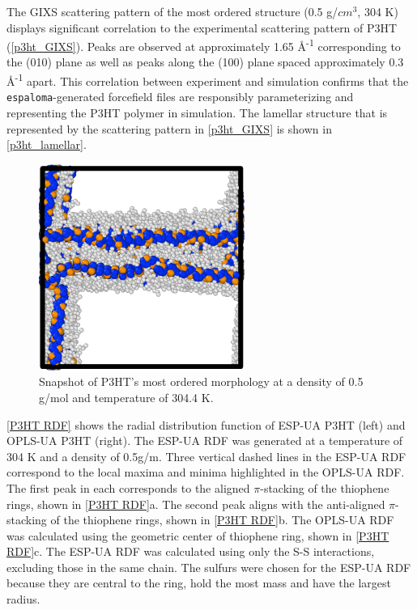 \par The GIXS scattering pattern of the most ordered structure (0.5 g/$cm^3$, 304 K) displays significant correlation to the experimental scattering pattern of P3HT (\autoref{p3ht_GIXS}). Peaks are observed at approximately 1.65 \AA \textsuperscript{-1} corresponding to the (010) plane as well as peaks along the (100) plane spaced approximately 0.3 \AA \textsuperscript{-1} apart. This correlation between experiment and simulation confirms that the \texttt{espaloma}-generated forcefield files are responsibly parameterizing and representing the P3HT polymer in simulation. The lamellar structure that is represented by the scattering pattern in \autoref{p3ht_GIXS} is shown in \autoref{p3ht_lamellar}. 
\begin{figure}[hbt!]
    \centering
    \includegraphics[width=0.6\textwidth]{src/figures/FF_figs/p3ht_0.5den_2.42kT.png}
    \caption{Snapshot of P3HT's most ordered morphology at a density of 0.5 g/mol and temperature of 304.4 K.}
    \label{p3ht_lamellar}
\end{figure}
\par \autoref{P3HT RDF} shows the radial distribution function of ESP-UA P3HT (left) and OPLS-UA P3HT (right). The ESP-UA RDF was generated at a temperature of 304 K and a density of 0.5g/m. Three vertical dashed lines in the ESP-UA RDF correspond to the local maxima and minima highlighted in the OPLS-UA RDF. The first peak in each corresponds to the aligned $\pi$-stacking of the thiophene rings, shown in \autoref{P3HT RDF}a. The second peak aligns with the anti-aligned $\pi$-stacking of the thiophene rings, shown in \autoref{P3HT RDF}b. The OPLS-UA RDF was calculated using the geometric center of thiophene ring, shown in \autoref{P3HT RDF}c. The ESP-UA RDF was calculated using only the S-S interactions, excluding those in the same chain. The sulfurs were chosen for the ESP-UA RDF because they are central to the ring, hold the most mass and have the largest radius. 
